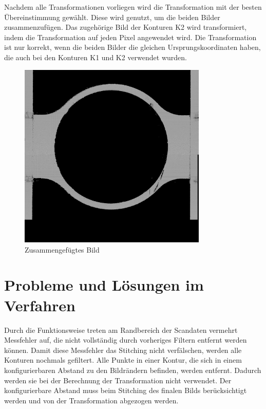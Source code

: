 Nachdem alle Transformationen vorliegen wird die Transformation mit der besten 
Übereinstimmung gewählt. Diese wird genutzt, um die beiden Bilder zusammenzufügen.
Das zugehörige Bild der Konturen K2 wird transformiert, indem die Transformation 
auf jeden Pixel angewendet wird.  
Die Transformation ist nur korrekt, wenn die beiden Bilder die gleichen 
Ursprungskoordinaten haben, die auch bei den Konturen K1 und K2 verwendet wurden.

\begin{figure}[h]
    \centering
    \includegraphics[width=0.8\textwidth]{images/AM_SP0_stitched_2.png} %
    \caption{Zusammengefügtes Bild}
    \label{fig:stitched_image}
\end{figure}

\section{Probleme und Lösungen im Verfahren} \label{solutions}

Durch die Funktionsweise treten am Randbereich der Scandaten vermehrt Messfehler auf, 
die nicht vollständig durch vorheriges Filtern entfernt werden können. 
Damit diese Messfehler das Stitching nicht verfälschen, werden alle Konturen nochmals 
gefiltert. Alle Punkte in einer Kontur, die sich in einem konfigurierbaren 
Abstand zu den Bildrändern befinden, werden entfernt. Dadurch werden sie bei der 
Berechnung der Transformation nicht verwendet. 
Der konfigurierbare Abstand muss beim Stitching des finalen Bilds berücksichtigt 
werden und von der Transformation abgezogen werden.

